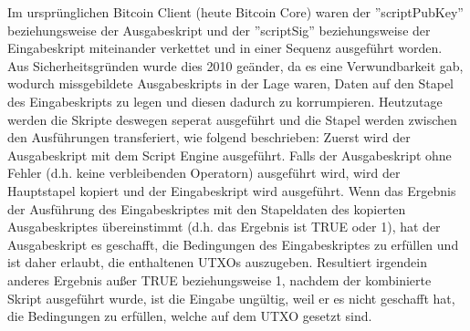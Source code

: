 Im ursprünglichen Bitcoin Client (heute Bitcoin Core) waren der ''scriptPubKey'' beziehungsweise der Ausgabeskript und der 
''scriptSig'' beziehungsweise der Eingabeskript miteinander verkettet und in einer Sequenz ausgeführt worden. Aus 
Sicherheitsgründen wurde dies 2010 geänder, da es eine Verwundbarkeit gab, wodurch missgebildete Ausgabeskripts in der 
Lage waren, Daten auf den Stapel des Eingabeskripts zu legen und diesen dadurch zu korrumpieren. Heutzutage werden die Skripte
deswegen seperat ausgeführt und die Stapel werden zwischen den Ausführungen transferiert, wie folgend beschrieben: Zuerst wird
der Ausgabeskript mit dem Script Engine ausgeführt. Falls der Ausgabeskript ohne Fehler (d.h. keine verbleibenden Operatorn)
ausgeführt wird, wird der Hauptstapel kopiert und der Eingabeskript wird ausgeführt. Wenn das Ergebnis der Ausführung des 
Eingabeskriptes mit den Stapeldaten des kopierten Ausgabeskriptes übereinstimmt (d.h. das Ergebnis ist TRUE oder 1), hat der 
Ausgabeskript es geschafft, die Bedingungen des Eingabeskriptes zu erfüllen und ist daher erlaubt, die enthaltenen UTXOs
auszugeben. Resultiert irgendein anderes Ergebnis außer TRUE beziehungsweise 1, nachdem der kombinierte Skript ausgeführt wurde,
ist die Eingabe ungültig, weil er es nicht geschafft hat, die Bedingungen zu erfüllen, welche auf dem UTXO gesetzt sind.